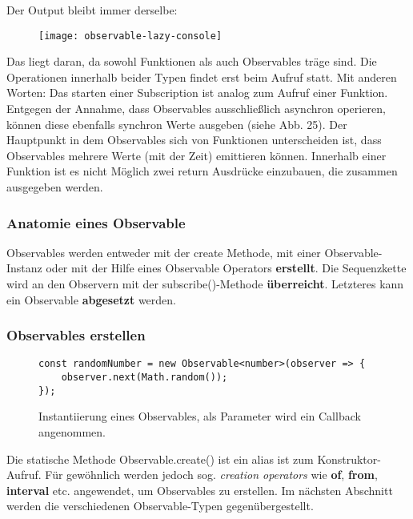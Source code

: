 \noindent
Der Output bleibt immer derselbe:

\begin{figure}[H]
\begin{center}
\texttt{[image: observable-lazy-console]}
\end{center}
\end{figure}

\noindent
Das liegt daran, da sowohl Funktionen als auch Observables träge sind. Die Operationen innerhalb beider Typen findet erst beim Aufruf statt. Mit anderen Worten: Das starten einer Subscription ist analog zum Aufruf einer Funktion. Entgegen der Annahme, dass Observables ausschließlich asynchron operieren, können diese ebenfalls synchron Werte ausgeben (siehe Abb. 25).
Der Hauptpunkt in dem Observables sich von Funktionen unterscheiden ist, dass Observables mehrere Werte (mit der Zeit) emittieren können. Innerhalb einer Funktion ist es nicht Möglich zwei return Ausdrücke einzubauen, die zusammen ausgegeben werden.

\subsubsection{Anatomie eines Observable}
Observables werden entweder mit der create Methode, mit einer Observable-Instanz oder mit der Hilfe eines Observable Operators \textbf{erstellt}. Die Sequenzkette wird an den Observern mit der subscribe()-Methode \textbf{überreicht}. Letzteres kann ein Observable \textbf{abgesetzt} werden.

\subsubsection{Observables erstellen}

\begin{figure}[H]
\begin{lstlisting}[basicstyle=\small]
const randomNumber = new Observable<number>(observer => {
    observer.next(Math.random());
});
\end{lstlisting}
\caption{Instantiierung eines Observables, als Parameter wird ein Callback angenommen.}
\end{figure}

\noindent
Die statische Methode Observable.create() ist ein alias ist zum Konstruktor-Aufruf. Für gewöhnlich werden jedoch sog. \textit{creation operators} wie \textbf{of}, \textbf{from}, \textbf{interval} etc. angewendet, um Observables zu erstellen. Im nächsten Abschnitt werden die verschiedenen Observable-Typen gegenübergestellt.

